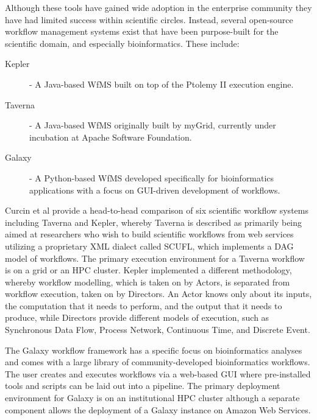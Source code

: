 Although these tools have gained wide adoption in the enterprise community they have had limited success within scientific circles. Instead, several open-source workflow management systems exist that have been purpose-built for the scientific domain, and especially bioinformatics. These include:

\begin{description}
\item[Kepler\autocite{ludascher2006scientific}] - A Java-based WfMS built on top of the Ptolemy II\autocite{davis1999overview} execution engine.
\item[Taverna\autocite{oinn2004taverna}] - A Java-based WfMS originally built by myGrid, currently under incubation at Apache Software Foundation. 
\item[Galaxy\autocite{goecks2010galaxy}] - A Python-based WfMS developed specifically for bioinformatics applications with a focus on GUI-driven development of workflows.
\end{description}

Curcin et al\autocite{curcin2008scientific} provide a head-to-head comparison of six scientific workflow systems including Taverna and Kepler, whereby Taverna is described as primarily being aimed at researchers who wish to build scientific workflows from web services utilizing a proprietary XML dialect called SCUFL, which implements a DAG model of workflows. The primary execution environment for a Taverna workflow is on a grid or an HPC cluster. Kepler implemented a different methodology, whereby workflow modelling, which is taken on by Actors, is separated from workflow execution, taken on by Directors. An Actor knows only about its inputs, the computation that it needs to perform, and the output that it needs to produce, while Directors provide different models of execution, such as Synchronous Data Flow, Process Network, Continuous Time, and Discrete Event.

The Galaxy workflow framework has a specific focus on bioinformatics analyses and comes with a large library of community-developed bioinformatics workflows. The user creates and executes workflows via a web-based GUI where pre-installed tools and scripts can be laid out into a pipeline. The primary deployment environment for Galaxy is on an institutional HPC cluster although a separate component allows the deployment of a Galaxy instance on Amazon Web Services\autocite{afgan2010galaxy}.


